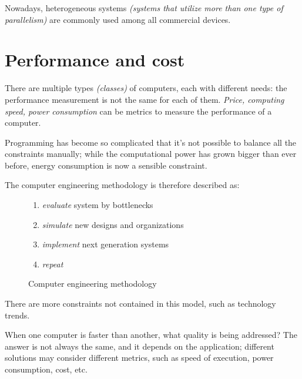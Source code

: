 \documentclass[english]{article}
\begin{document}
Nowadays, heterogeneous systems \textit{(systems that utilize more than one type of parallelism)} are commonly used among all commercial devices.

\clearpage

\section{Performance and cost}

There are multiple types \textit{(classes)} of computers, each with different needs:
the performance measurement is not the same for each of them.
\textit{Price, computing speed, power consumption} can be metrics to measure the performance of a computer.

Programming has become so complicated that it's not possible to balance all the constraints manually;
while the computational power has grown bigger than ever before, energy consumption is now a sensible constraint.

The computer engineering methodology is therefore described as:

\begin{figure}[htbp]
  \bigskip
  \centering
  \begin{minipage}[h]{0.495\textwidth}
    \centering
  \end{minipage}
  \begin{minipage}[h]{0.495\textwidth}
    \begin{enumerate}
      \item \label{enum:methodology-start} \textit{evaluate} system by bottlenecks
      \item \textit{simulate} new designs and organizations
      \item \textit{implement} next generation systems
      \item \textit{repeat}
    \end{enumerate}
  \end{minipage}
  \caption{Computer engineering methodology}
  \label{fig:computer-engineering-methodology}
  \bigskip
\end{figure}

There are more constraints not contained in this model, such as technology trends.

\bigskip
When one computer is faster than another, what quality is being addressed?
The answer is not always the same, and it depends on the application;
different solutions may consider different metrics, such as
speed of execution, power consumption, cost, etc.
\end{document}
